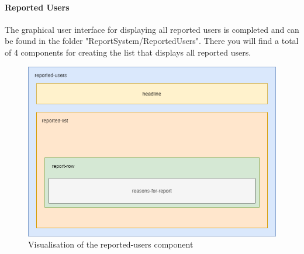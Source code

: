 \paragraph{Reported Users}
The graphical user interface for displaying all reported users is completed and can be found in the folder "ReportSystem/ReportedUsers".
There you will find a total of 4 components for creating the list that displays all reported users.
\\
\begin{figure}[h]
    \centering
    \includegraphics[width=1.0\textwidth]{./images/report_component}
    \caption{Visualisation of the reported-users component}
    \label{fig:reportedusers}
\end{figure}
\\
